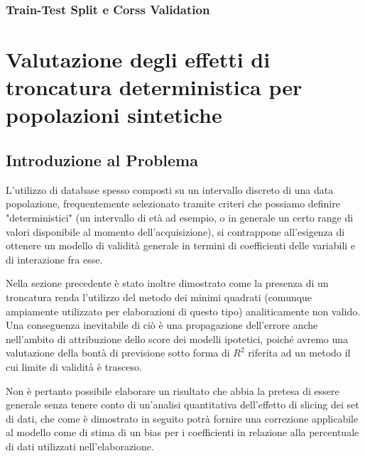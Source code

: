 \documentclass[a4paper]{report}
\begin{document}
\subsection{Train-Test Split e Corss Validation}





  
  
  

  











 

\chapter{Valutazione degli effetti di troncatura deterministica per popolazioni sintetiche}

\section{Introduzione al Problema}
L'utilizzo di database spesso composti su un intervallo discreto di una data popolazione, frequentemente selezionato tramite criteri che possiamo definire "deterministici" (un intervallo di età ad esempio, o in generale un certo range di valori disponibile al momento dell'acquisizione), si contrappone all'esigenza di ottenere un modello di validità generale in termini di coefficienti delle variabili e di interazione fra esse.

Nella sezione precedente è stato inoltre dimostrato come la presenza di un troncatura renda l'utilizzo del metodo dei minimi quadrati (comunque ampiamente utilizzato per elaborazioni di questo tipo) analiticamente non valido. 
Una conseguenza inevitabile di ciò è una propagazione dell'errore anche nell'ambito di attribuzione dello score dei modelli ipotetici, poiché avremo una valutazione della bontà di previsione sotto forma di $R^2$ riferita ad un metodo il cui limite di validità è trasceso.

Non è pertanto possibile elaborare un risultato che abbia la pretesa di essere generale senza tenere conto di un'analisi quantitativa dell'effetto di slicing dei set di dati, che come è dimostrato in seguito potrà fornire una correzione applicabile al modello come di stima di un bias per i coefficienti in relazione alla percentuale di dati utilizzati nell'elaborazione.
\end{document}
